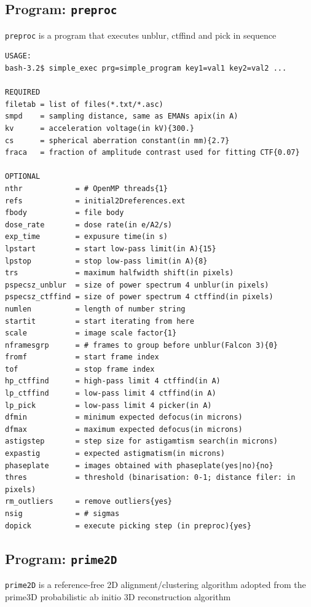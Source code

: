 \documentclass[a4paper,11pt]{article}
\newcommand{\prgname}[1]{\textcolor{NavyBlue}{\texttt{#1}}}
\begin{document}
\subsection{Program: \prgname{preproc}}
\label{preproc}
\prgname{preproc} is a program that executes unblur, ctffind and pick in sequence 

\begin{verbatim}
USAGE:
bash-3.2$ simple_exec prg=simple_program key1=val1 key2=val2 ...

REQUIRED
filetab = list of files(*.txt/*.asc)
smpd    = sampling distance, same as EMANs apix(in A)
kv      = acceleration voltage(in kV){300.}
cs      = spherical aberration constant(in mm){2.7}
fraca   = fraction of amplitude contrast used for fitting CTF{0.07}

OPTIONAL
nthr            = # OpenMP threads{1}
refs            = initial2Dreferences.ext
fbody           = file body
dose_rate       = dose rate(in e/A2/s)
exp_time        = expusure time(in s)
lpstart         = start low-pass limit(in A){15}
lpstop          = stop low-pass limit(in A){8}
trs             = maximum halfwidth shift(in pixels)
pspecsz_unblur  = size of power spectrum 4 unblur(in pixels)
pspecsz_ctffind = size of power spectrum 4 ctffind(in pixels)
numlen          = length of number string
startit         = start iterating from here
scale           = image scale factor{1}
nframesgrp      = # frames to group before unblur(Falcon 3){0}
fromf           = start frame index
tof             = stop frame index
hp_ctffind      = high-pass limit 4 ctffind(in A)
lp_ctffind      = low-pass limit 4 ctffind(in A)
lp_pick         = low-pass limit 4 picker(in A)
dfmin           = minimum expected defocus(in microns)
dfmax           = maximum expected defocus(in microns)
astigstep       = step size for astigamtism search(in microns)
expastig        = expected astigmatism(in microns)
phaseplate      = images obtained with phaseplate(yes|no){no}
thres           = threshold (binarisation: 0-1; distance filer: in pixels)
rm_outliers     = remove outliers{yes}
nsig            = # sigmas
dopick          = execute picking step (in preproc){yes}
\end{verbatim}

\subsection{Program: \prgname{prime2D}}
\label{prime2D}
\prgname{prime2D} is a reference-free 2D alignment/clustering algorithm adopted from the prime3D probabilistic ab initio 3D reconstruction algorithm
\end{document}
